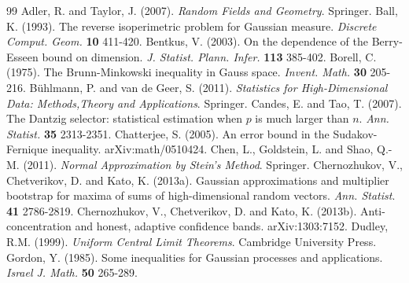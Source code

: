 \documentclass[11pt,reqno]{amsart}
\theoremstyle{definition}
\begin{document}
\begin{thebibliography}{99}
Adler, R. and Taylor, J. (2007). {\em Random Fields and Geometry}. Springer.
Ball, K. (1993). The reverse isoperimetric problem for Gaussian measure. {\em Discrete Comput. Geom.} \textbf{10} 411-420.
Bentkus, V. (2003). On the dependence of the Berry-Esseen bound on dimension. {\em J. Statist. Plann. Infer.} \textbf{113} 385-402.
Borell, C. (1975). The Brunn-Minkowski inequality in Gauss space. {\em Invent. Math.} \textbf{30} 205-216.
B\"{u}hlmann, P. and van de Geer, S. (2011). {\em Statistics for High-Dimensional Data: Methods,Theory and Applications}. Springer.
Candes, E. and Tao, T. (2007). The Dantzig selector: statistical estimation when $p$ is much larger than $n$. {\em Ann. Statist.} \textbf{35} 2313-2351.
Chatterjee, S. (2005). An error bound in the Sudakov-Fernique inequality. arXiv:math/0510424.
Chen, L., Goldstein, L. and Shao, Q.-M.  (2011). {\em Normal Approximation by Stein's Method}. Springer.
Chernozhukov, V., Chetverikov, D. and Kato, K. (2013a). Gaussian approximations and multiplier bootstrap for maxima of sums of high-dimensional random vectors.  {\em Ann. Statist}. \textbf{41} 2786-2819.
Chernozhukov, V., Chetverikov, D. and Kato, K. (2013b). Anti-concentration and honest, adaptive confidence bands. arXiv:1303:7152.
Dudley, R.M. (1999). {\em Uniform Central Limit Theorems}. Cambridge University Press.
Gordon, Y. (1985). Some inequalities for Gaussian processes and applications. {\em Israel J. Math. } \textbf{50} 265-289.

\end{thebibliography}
\end{document}
